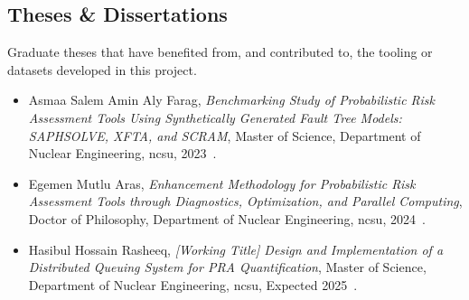\subsection{Theses \& Dissertations}
Graduate theses that have benefited from, and contributed to, the tooling or datasets developed in this project.
\begin{itemize}
    \item {Asmaa Salem Amin Aly Farag, \textit{Benchmarking Study of Probabilistic Risk Assessment Tools Using Synthetically Generated Fault Tree Models: SAPHSOLVE, XFTA, and SCRAM}, Master of Science, Department of Nuclear Engineering, \acrshort{ncsu}, 2023~\cite{farag_thesis_2023}.}
    \item {Egemen Mutlu Aras, \textit{Enhancement Methodology for Probabilistic Risk Assessment Tools through Diagnostics, Optimization, and Parallel Computing}, Doctor of Philosophy, Department of Nuclear Engineering, \acrshort{ncsu}, 2024~\cite{aras_dissertation_2024}.}
    \item {Hasibul Hossain Rasheeq, \textit{[Working Title] Design and Implementation of a Distributed Queuing System for PRA Quantification}, Master of Science, Department of Nuclear Engineering, \acrshort{ncsu}, Expected 2025~\cite{rasheeq_thesis_2025}.}
\end{itemize}